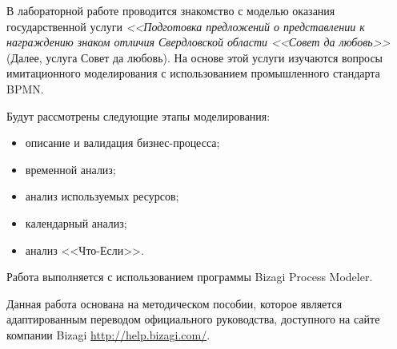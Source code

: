 \Introduction

В лабораторной работе проводится знакомство с моделью оказания
государственной услуги \textit{<<Подготовка предложений о представлении
к награждению знаком отличия Свердловской области <<Совет да любовь>>}
(Далее, услуга Совет да любовь). На основе этой услуги
изучаются вопросы имитационного моделирования с использованием
промышленного стандарта BPMN.

Будут рассмотрены следующие этапы моделирования:

\begin{itemize}
    \item описание и валидация бизнес-процесса;
    \item временной анализ;
    \item анализ используемых ресурсов;
    \item календарный анализ;
    \item анализ <<Что-Если>>.
\end{itemize}

Работа выполняется с использованием программы Bizagi Process
Modeler.

Данная работа основана на методическом пособии, которое является
адаптированным переводом официального руководства,
доступного на сайте компании Bizagi \url{http://help.bizagi.com/}.
